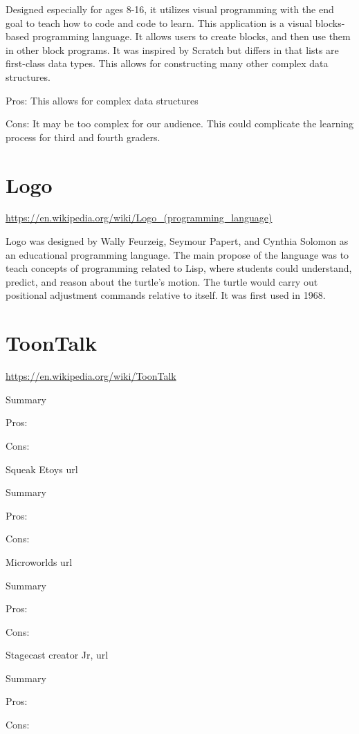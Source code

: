 Designed especially for ages 8-16, it utilizes visual programming with the end goal to teach how to code and code to learn.  This application is a visual blocks-based programming language. It allows users to create blocks, and then use them in other block programs. It was inspired by Scratch but differs in that lists are first-class data types. This allows for constructing many other complex data structures.

Pros: This allows for complex data structures

Cons: It may be too complex for our audience. This could complicate the learning process for third and fourth graders.



\section{Logo}
\url{https://en.wikipedia.org/wiki/Logo_(programming_language)}

Logo was designed by Wally Feurzeig, Seymour Papert, and Cynthia Solomon as an educational programming language. The main propose of the language was to teach concepts of programming related to Lisp, where students could understand, predict, and reason about the turtle’s motion. The turtle would carry out positional adjustment commands relative to itself. It was first used in 1968. 



\section{ToonTalk}
\url{https://en.wikipedia.org/wiki/ToonTalk}

Summary

Pros: 

Cons: 

Squeak Etoys
url

Summary

Pros: 

Cons: 

Microworlds
url

Summary

Pros: 

Cons: 

Stagecast creator Jr, 
url

Summary

Pros: 

Cons: 

